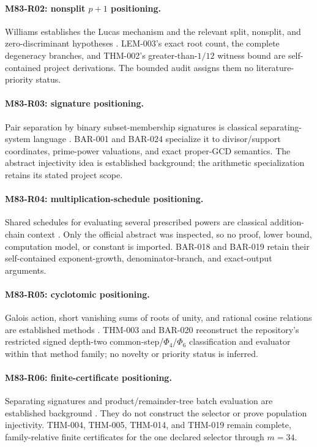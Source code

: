 \documentclass[11pt]{article}
\begin{document}
\paragraph{M83-R02: nonsplit \(p+1\) positioning.}
Williams establishes the Lucas mechanism and the relevant split, nonsplit,
and zero-discriminant hypotheses \cite{williams1982pplusone}. LEM-003's exact
root count, the complete degeneracy branches, and THM-002's
greater-than-\(1/12\) witness bound are self-contained project derivations.
The bounded audit assigns them no literature-priority status.

\paragraph{M83-R03: signature positioning.}
Pair separation by binary subset-membership signatures is classical
separating-system language \cite{katona1966separating}. BAR-001 and BAR-024
specialize it to divisor/support coordinates, prime-power valuations, and
exact proper-GCD semantics. The abstract injectivity idea is established
background; the arithmetic specialization retains its stated project scope.

\paragraph{M83-R04: multiplication-schedule positioning.}
Shared schedules for evaluating several prescribed powers are classical
addition-chain context \cite{yao1976evaluation}. Only the official abstract
was inspected, so no proof, lower bound, computation model, or constant is
imported. BAR-018 and BAR-019 retain their self-contained exponent-growth,
denominator-branch, and exact-output arguments.

\paragraph{M83-R05: cyclotomic positioning.}
Galois action, short vanishing sums of roots of unity, and rational cosine
relations are established methods \cite{conway1976trigonometric}. THM-003
and BAR-020 reconstruct the repository's restricted signed depth-two
common-step/\(\Phi_4\)/\(\Phi_6\) classification and evaluator within that
method family; no novelty or priority status is inferred.

\paragraph{M83-R06: finite-certificate positioning.}
Separating signatures and product/remainder-tree batch evaluation are
established background \cite{bernstein2004smoothparts}. They do not construct
the selector or prove population injectivity. THM-004, THM-005, THM-014, and
THM-019 remain complete, family-relative finite certificates for the one
declared selector through \(m=34\).
\end{document}

